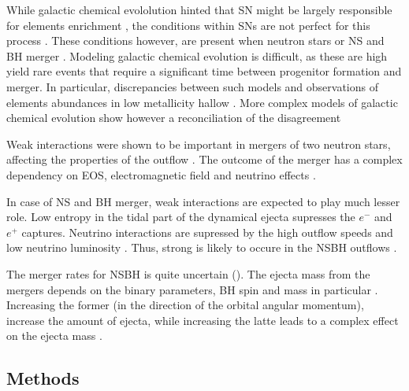 While galactic chemical evololution hinted that \ac{SN} might be largely responsible for \rproc{} elements enrichment \citep[\eg][]{Qian:2000bh,Argast:2003he}, the conditions within \acp{SN} are not perfect for this process \cite[\eg][]{Arcones:2012wj}. These conditions however, are present when neutron stars or NS and BH merger \citep{Freiburghaus:1999}. Modeling galactic chemical evolution is difficult, as these are high yield rare events that require a significant time between progenitor formation and merger. In particular, discrepancies between such models and observations of \rproc{} elements abundances in low metallicity hallow \citep{Qian:2000bh,Argast:2003he}. More complex models of galactic chemical evolution show however a reconciliation of the disagreement \citep{Matteucci:2014,Shen:2015,VanDeVoort:2015,Ishimaru:2015} 

Weak interactions were shown to be important in mergers of two neutron stars, affecting the properties of the outflow \citep{Wanajo:2014wha,Goriely:2015fqa,Sekiguchi:2015dma,Foucart:2015gaa,Palenzuela:2015dqa,Radice:2016dwd} . The outcome of the merger has a complex dependency on \ac{EOS}, electromagnetic field and neutrino effects \citep[\eg][]{Neilsen:2014hha,Palenzuela:2015dqa}.

In case of NS and BH merger, weak interactions are expected to play much lesser role. Low entropy in the tidal part of the dynamical ejecta supresses the $e^{-}$ and $e^{+}$ captures. Neutrino interactions are supressed by the high outflow speeds and low neutrino luminosity \citep[\eg][]{Foucart:2014nda,Foucart:2015vpa}. Thus, strong \rproc{} is likely to occure in the \ac{NSBH} outflows \citep{Lattimer:1976,Lattimer:1977,Korobkin:2012uy,Bauswein:2014qla}.

The merger rates for \ac{NSBH} is quite uncertain (). The ejecta mass from the mergers depends on the binary parameters, BH spin and mass in particular \citep{Foucart:2012vn,Hotokezaka:2013kza,Bauswein:2014qla,Kyutoku:2015gda}. Increasing the former (in the direction of the orbital angular momentum), increase the amount of ejecta, while increasing the latte leads to a complex effect on the ejecta mass \citep{Kyutoku:2015gda}.


\subsection{Methods}

